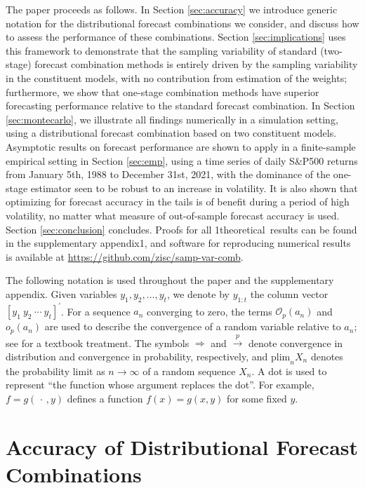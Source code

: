 \documentclass[12pt]{article}
\newcommand{\blind}{1}
\theoremstyle{definition}
\theoremstyle{remark}
\begin{document}
{The paper proceeds as follows. In Section \ref{sec:accuracy} we introduce generic notation for the distributional forecast combinations we consider, and discuss how to assess the performance of these combinations. Section \ref{sec:implications} uses this framework to demonstrate that the sampling variability of standard (two-stage) forecast combination methods is entirely driven by the sampling variability in the constituent models, with no contribution from estimation of the weights; furthermore, we show that one-stage combination methods have superior forecasting performance relative to the standard forecast combination. In Section \ref{sec:montecarlo}, we illustrate all findings numerically in a simulation setting, using a distributional forecast combination based on two constituent models. Asymptotic results on forecast performance are shown to apply in a finite-sample empirical setting in Section \ref{sec:emp}, using a time series of daily S\&P500 returns from January 5th, 1988 to December 31st, 2021, with the dominance of the one-stage estimator seen to be robust to an increase in volatility. It is also shown that optimizing for forecast accuracy in the tails is of benefit during a period of high volatility, no matter what measure of out-of-sample forecast accuracy is used. Section \ref{sec:conclusion} concludes. Proofs for all \blind{theoretical\ }\fi results can be found in the supplementary appendix\blind{, and software for reproducing numerical results is available at \href{https://github.com/zisc/samp-var-comb}{https://github.com/zisc/samp-var-comb}}\fi.

The following notation is used throughout the paper and the supplementary appendix. Given variables $y_{1},y_{2},\ldots ,y_{t}$, we denote by $y_{1:t}$ the column vector $[y_{1}\ y_{2}\ \cdots \ y_{t}]^{\prime }$. For a sequence $a_{n}$ converging to zero, the terms $\mathcal{O}_{p}(a_{n})$ and $o_{p}(a_{n})$ are used to describe the convergence of a random variable relative to $a_{n}$; see \cite{VanDerVaart1998} for a textbook treatment. The symbols $\Rightarrow $ and $\overset{p}{\rightarrow }$ denote convergence in distribution and convergence in probability, respectively, and $\mathrm{plim}_n X_n$ denotes the probability limit as $n \to \infty$ of a random sequence $X_n$. A dot is used to represent \textquotedblleft the function whose argument replaces the dot\textquotedblright . For example, $f=g(\,\cdot \,,y)$ defines a function $f(x)=g(x,y)$ for some fixed $y$.

\section{Accuracy of Distributional Forecast Combinations\label{sec:accuracy}}

}
\end{document}
